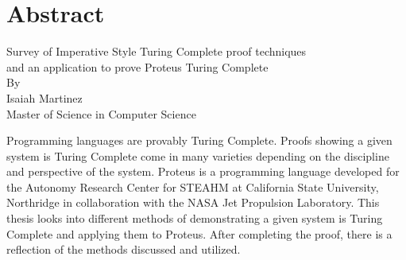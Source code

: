 \chapter*{\normalfont Abstract}\label{chapter:Abstract}
\begin{center}
    Survey of Imperative Style Turing Complete proof techniques\\
    and an application to prove Proteus Turing Complete\\
    \vspace{0.15in}
    By\\
    \vspace{0.15in}
    Isaiah Martinez\\
    \vspace{0.3in}
    Master of Science in Computer Science\\
    \vspace{0.15in}
\end{center}


Programming languages are provably Turing Complete.
Proofs showing a given system is Turing Complete come in many varieties depending on the discipline and perspective of the system.
Proteus is a programming language developed for the Autonomy Research Center for STEAHM at California State University, Northridge in collaboration with the NASA Jet Propulsion Laboratory.
This thesis looks into different methods of demonstrating a given system is Turing Complete and applying them to Proteus.
After completing the proof, there is a reflection of the methods discussed and utilized.